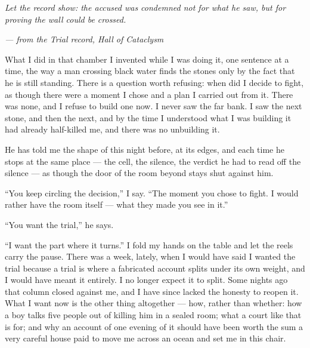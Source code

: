 
\textit{Let the record show: the accused was condemned not for what he saw, but for proving the wall could be crossed.}\par
\textit{--- from the Trial record, Hall of Cataclysm}\par
 
\ornament

What I did in that chamber I invented while I was doing it, one sentence at a time, the way a man crossing black water finds the stones only by the fact that he is still standing. There is a question worth refusing: when did I decide to fight, as though there were a moment I chose and a plan I carried out from it. There was none, and I refuse to build one now. I never saw the far bank. I saw the next stone, and then the next, and by the time I understood what I was building it had already half-killed me, and there was no unbuilding it.\par
 
\ornament
 
He has told me the shape of this night before, at its edges, and each time he stops at the same place --- the cell, the silence, the verdict he had to read off the silence --- as though the door of the room beyond stays shut against him.\par
 
``You keep circling the decision,'' I say. ``The moment you chose to fight. I would rather have the room itself --- what they made you see in it.''\par
 
``You want the trial,'' he says.\par
 
``I want the part where it turns.'' I fold my hands on the table and let the reels carry the pause. There was a week, lately, when I would have said I wanted the trial because a trial is where a fabricated account splits under its own weight, and I would have meant it entirely. I no longer expect it to split. Some nights ago that column closed against me, and I have since lacked the honesty to reopen it. What I want now is the other thing altogether --- how, rather than whether: how a boy talks five people out of killing him in a sealed room; what a court like that is for; and why an account of one evening of it should have been worth the sum a very careful house paid to move me across an ocean and set me in this chair.\par
 
